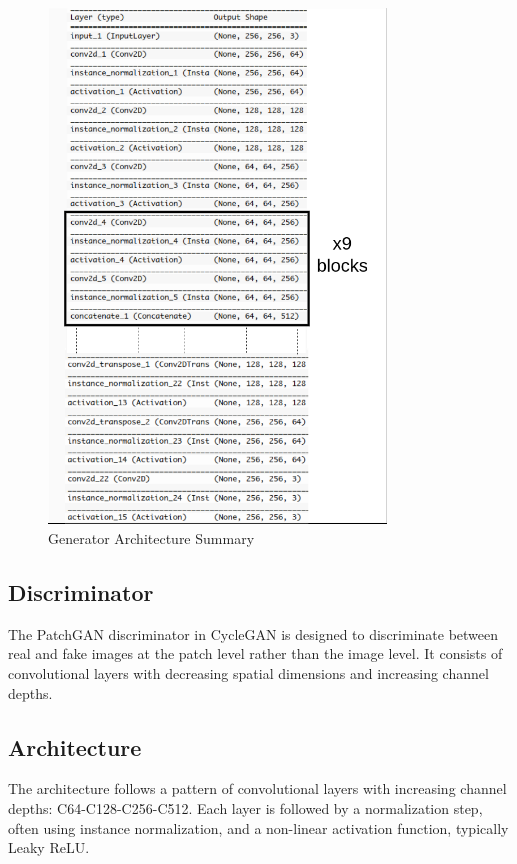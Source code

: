 \begin{figure}[htbp]
    \centering
    \includegraphics[width=0.8\textwidth]{chapter/output/gen_summary.png}
    \caption{Generator Architecture Summary}
    \label{fig:gen_summary}
\end{figure}

\pagebreak

\subsection{Discriminator}
The PatchGAN discriminator \cite{zhu2020unpaired} in CycleGAN is designed to discriminate between real and fake images at the patch level rather than the image level. It consists of convolutional layers with decreasing spatial dimensions and increasing channel depths.

\subsection*{Architecture}
The architecture follows a pattern of convolutional layers with increasing channel depths: C64-C128-C256-C512. Each layer is followed by a normalization step, often using instance normalization, and a non-linear activation function, typically Leaky ReLU.
